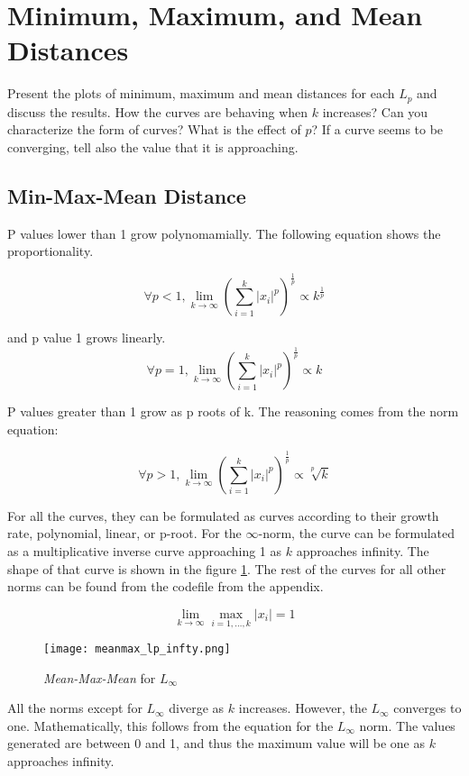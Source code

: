 \section{Minimum, Maximum, and Mean Distances}
Present the plots of minimum, maximum and mean distances for each \( L_p \) and discuss the results. How the curves are behaving when \( k \) increases? Can you characterize the form of curves? What is the effect of \( p \)? If a curve seems to be converging, tell also the value that it is approaching.
\subsection{Min-Max-Mean Distance}

P values lower than 1 grow polynomamially.
The following equation shows the proportionality.


\begin{equation}
    \forall p < 1, \lim_{k \to \infty} \left( \sum_{i=1}^{k} |x_i|^p \right)^{\frac{1}{p}} \propto k^{\frac{1}{p}}
\end{equation}


and p value 1 grows linearly.
\begin{equation}
    \forall p = 1, \lim_{k \to \infty} \left( \sum_{i=1}^{k} |x_i|^p \right)^{\frac{1}{p}} \propto k
\end{equation}

P values greater than 1 grow as p roots of k. The reasoning comes from the norm equation:

\begin{equation}
    \forall p > 1, \lim_{k \to \infty} \left( \sum_{i=1}^{k} |x_i|^p \right)^{\frac{1}{p}} \propto \sqrt[p]{k}
\end{equation}


For all the curves, they can be formulated as curves according to their growth rate, polynomial, linear, or p-root. For the \(\infty\)-norm, the curve can be formulated as a multiplicative inverse curve approaching 1 as \(k\) approaches infinity. The shape of that curve is shown in the figure \ref{fig:meanmax_lp_infty}. The rest of the curves for all other norms can be found from the codefile from the appendix.

\begin{equation}
    \lim_{k \to \infty} \max_{i=1,\ldots,k} |x_i| = 1
\end{equation}

\FloatBarrier  %

\begin{figure}[htbp]
    \centering
    \texttt{[image: meanmax\_lp\_infty.png]}
    \caption{\emph{Mean-Max-Mean} for $L_{\infty}$}
    \label{fig:meanmax_lp_infty}
\end{figure}

All the norms except for \( L_\infty \) diverge as \(k\) increases. However, the \( L_\infty \) converges to one. Mathematically, this follows from the equation for the \( L_\infty \) norm. The values generated are between 0 and 1, and thus the maximum value will be one as \(k\) approaches infinity.

\FloatBarrier  %
